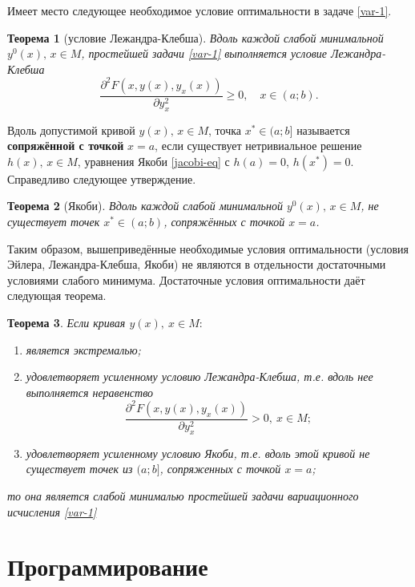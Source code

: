 \documentclass[a4paper, 12pt]{report}
\numberwithin{equation}{section}
\renewcommand{\geq}{\geqslant}
\renewcommand{\d}{\partial}
\newtheorem*{theorem}{Теорема}
\begin{document}
	Имеет место следующее необходимое условие оптимальности в задаче \eqref{var-1}.
	\begin{theorem}
		[условие Лежандра-Клебша]
		Вдоль каждой слабой минимальной $y^0(x), \, x \in M$, простейшей задачи \eqref{var-1} выполняется условие Лежандра-Клебша
		\[
		\frac{\partial^2 F(x, y(x), y_x(x))}{\partial y_x^2} \geq 0, \quad x \in (a; b).
		\]
	\end{theorem}
	\noindent
	Вдоль допустимой кривой $y(x), \, x \in M$, точка $x^* \in (a; b]$ называется \textbf{сопряжённой с точкой} $x = a$, если существует нетривиальное решение $h(x), \, x \in M$, уравнения Якоби \eqref{jacobi-eq} с $h(a) = 0$, $h(x^*) = 0$.
	Справедливо следующее утверждение.
	\begin{theorem}
		[Якоби]
		Вдоль каждой слабой минимальной $y^0(x), \, x \in M$, не существует точек $x^* \in (a; b)$, сопряжённых с точкой $x = a$.
	\end{theorem}
	\noindent
	Таким образом, вышеприведённые необходимые условия оптимальности (условия Эйлера, Лежандра-Клебша, Якоби) не являются в отдельности достаточными условиями слабого минимума. Достаточные условия оптимальности даёт следующая теорема.
	\begin{theorem}
		Если кривая $y(x),\ x \in M:$
		\begin{enumerate}
			\item является экстремалью;
			\item удовлетворяет усиленному условию Лежандра-Клебша, т.е. вдоль нее выполняется неравенство
			\begin{equation}
				\dfrac{\d^2 F(x,y(x),y_x(x))}{\d y^2_x}>0,\ x \in M;
			\end{equation}
			\item удовлетворяет усиленному условию Якоби, т.е. вдоль этой кривой не существует точек из $(a;b]$, сопряженных с точкой $x=a$;
		\end{enumerate}
		то она является слабой минималью простейшей задачи вариационного исчисления \eqref{var-1}
	\end{theorem}
	\chapter{Программирование}
\end{document}
